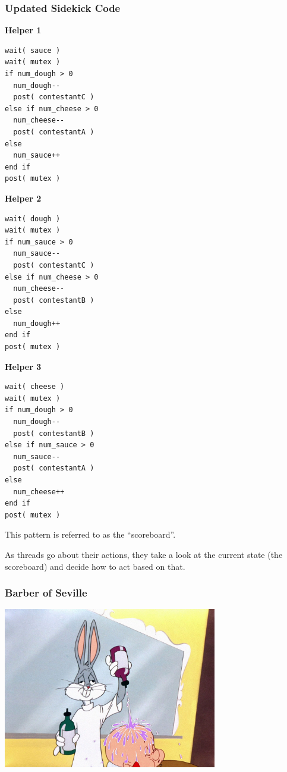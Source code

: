 \begin{frame}[fragile]
	\frametitle{Updated Sidekick Code}

	\begin{multicols}{3}
		\textbf{Helper 1}
		\begin{lstlisting}
wait( sauce )
wait( mutex )
if num_dough > 0  
  num_dough--
  post( contestantC )
else if num_cheese > 0
  num_cheese--
  post( contestantA )
else
  num_sauce++
end if  
post( mutex )
\end{lstlisting}
		\columnbreak
		\textbf{Helper 2}
		\begin{lstlisting}
wait( dough )
wait( mutex )
if num_sauce > 0  
  num_sauce--
  post( contestantC )
else if num_cheese > 0
  num_cheese--
  post( contestantB )
else
  num_dough++
end if  
post( mutex )
\end{lstlisting}
		\columnbreak
		\textbf{Helper 3}
		\begin{lstlisting}
wait( cheese )
wait( mutex )
if num_dough > 0 
  num_dough--
  post( contestantB )
else if num_sauce > 0
  num_sauce--
  post( contestantA )
else
  num_cheese++
end if  
post( mutex )
\end{lstlisting}
	\end{multicols}

	This pattern is referred to as the ``scoreboard''.

	As threads go about their actions, they take a look at the current state (the scoreboard) and decide how to act based on that.

\end{frame}

\begin{frame}
	\frametitle{Barber of Seville}

	\begin{center}
		\includegraphics[width=0.7\textwidth]{images/rabbitofseville.jpg}
	\end{center}

\end{frame}

